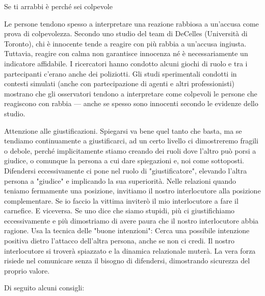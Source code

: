 \documentclass[12pt]{book} %
\begin{document}
\begin{mdframed}[linewidth=1pt]
Se ti arrabbi è perché sei colpevole

Le persone tendono spesso a interpretare una reazione rabbiosa a un'accusa come prova di colpevolezza. Secondo uno studio del team di DeCelles (Università di Toronto), chi è innocente tende a reagire con più rabbia a un'accusa ingiusta. Tuttavia, reagire con calma non garantisce innocenza né è necessariamente un indicatore affidabile. I ricercatori hanno condotto alcuni giochi di ruolo e
tra i partecipanti c'erano anche dei poliziotti. Gli studi sperimentali condotti in contesti simulati (anche con partecipazione di agenti e altri professionisti) mostrano che gli osservatori tendono a interpretare come colpevoli le persone che reagiscono con rabbia — anche se spesso sono innocenti secondo le evidenze dello studio. 

Attenzione alle giustificazioni. Spiegarsi va bene quel tanto che basta, ma se tendiamo continuamente a giustificarci, ad un certo livello ci dimostreremo fragili o debole, perché implicitamente stiamo creando dei ruoli dove l'altro può porsi a giudice, o comunque la persona a cui dare spiegazioni e, noi come sottoposti. 
Difendersi eccessivamente ci pone nel ruolo di "giustificatore", elevando l'altra persona a "giudice" e implicando la sua superiorità. 
Nelle relazioni quando teniamo fermamente una posizione, invitiamo il nostro interlocutore alla posizione complementare. 
Se io faccio la vittima inviterò il mio interlocutore a fare il carnefice. E viceversa.
Se uno dice che siamo stupidi, più ci giustifichiamo eccessivamente e più dimostriamo di avere paura che il nostro interlocutore abbia ragione.
Usa la tecnica delle "buone intenzioni": Cerca una possibile intenzione positiva dietro l'attacco dell'altra persona, anche se non ci credi. Il nostro interlocutore si troverà spiazzato e la dinamica relazionale muterà.
La vera forza risiede nel comunicare senza il bisogno di difendersi, dimostrando sicurezza del proprio valore.
\end{mdframed}

Di seguito alcuni consigli:
\end{document}
